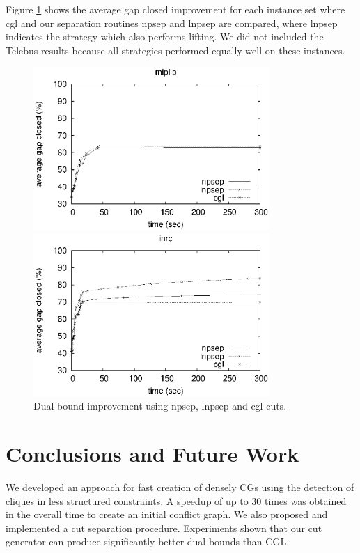 \documentclass{endm}
\begin{document}
Figure \ref{figExperiments} shows the average gap closed improvement for each instance set where cgl and our separation routines npsep and lnpsep are compared, where lnpsep indicates the strategy which also performs lifting. We did not included the Telebus results because all strategies performed equally well on these instances.

\begin{figure}	
	\begin{minipage}[h]{.5\textwidth}
		\begin{center}
			\includegraphics[width=0.8\textwidth]{miplib.eps}
		\end{center}
	\end{minipage}
	\begin{minipage}[h]{.5\textwidth}
		\begin{center}
			\includegraphics[width=0.8\textwidth]{nurse.eps}
		\end{center}
	\end{minipage}
	\caption{Dual bound improvement using npsep, lnpsep and cgl cuts.}
	\label{figExperiments}
\end{figure}

\section{Conclusions and Future Work}\label{conclusions}

We developed an approach for fast creation of densely CGs using the detection of cliques in less structured constraints. A speedup of up to 30 times was obtained in the overall time to create an initial conflict graph. We also proposed and implemented a cut separation procedure. Experiments shown that our cut generator can produce significantly better dual bounds than CGL.



\end{document}

